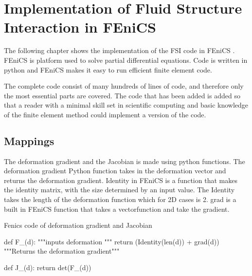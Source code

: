 \begin{comment}
\lstdefinelanguage{Python}{
 keywords={typeof, null, catch, switch, in, int, str, float, self},
 ndkeywords={boolean, throw, import},
 ndkeywords={return, class, if ,elif, endif, while, do, else, True, False , catch, def},
 ndkeywordstyle=\color{blue}\bfseries,
 identifierstyle=\color{black},
 sensitive=false,
 comment=[l]{\#},
 morecomment=[s]{/*}{*/},
 commentstyle=\color{purple}\ttfamily,
 stringstyle=\color{red}\ttfamily,
 backgroundcolor = \color{lightgray}
}
\end{comment}


\chapter{Implementation of Fluid Structure Interaction in FEniCS}
The following chapter shows the implementation of the FSI code in FEniCS \cite{FENICS}. FEniCS is platform used to solve partial differential equations. Code is written in python and FEniCS makes it easy to run efficient finite element code. \newline

The complete code consist of many hundreds of lines of code, and therefore only the most essential parts are covered. The code that has been added is added so that a reader with a minimal skill set in scientific computing and basic knowledge of the finite element method could implement a version of the code.



\section{Mappings}
The deformation gradient and the Jacobian is made using python functions. The deformation gradient Python function takes in the deformation vector and returns the deformation gradient. Identity in FEniCS is a function that makes the identity matrix, with the size determined by an input value. The Identity takes the length of the deformation function which for 2D cases is 2. grad is a built in FEniCS function that takes a vectorfunction and take the gradient.
\begin{python}\caption{Fenics code of deformation gradient and Jacobian}
def F_(d): """inputs deformation """
	return (Identity(len(d)) + grad(d))  """Returns the deformation gradient"""

def J_(d):
	return det(F_(d))
\end{python}


